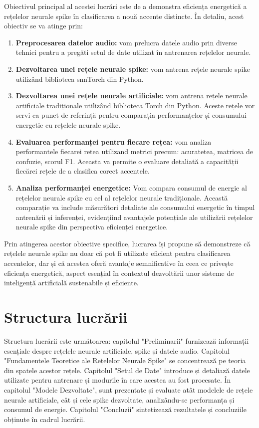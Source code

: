Obiectivul principal al acestei lucrări este de a demonstra eficiența energetică a rețelelor neurale spike în clasificarea a 
nouă accente distincte. În detaliu, acest obiectiv se va atinge prin:
\begin{enumerate}
    \item \textbf{Preprocesarea datelor audio:} vom prelucra datele audio prin diverse tehnici pentru a pregăti setul de date 
    utilizat în antrenarea rețelelor neurale.
    \item \textbf{Dezvoltarea unei rețele neurale spike:} vom antrena rețele neurale spike utilizând biblioteca snnTorch din 
    Python.
    \item \textbf{Dezvoltarea unei rețele neurale artificiale:} vom antrena rețele neurale artificiale tradiționale utilizând 
    biblioteca Torch din Python. Aceste rețele vor servi ca punct de referință pentru comparația performanțelor și consumului 
    energetic cu rețelele neurale spike.
    \item \textbf{Evaluarea performanței pentru fiecare rețea:} vom analiza performantele fiecarei retea utilizand metrici 
    precum: acuratetea, matricea de confuzie, scorul F1. Aceasta va permite o evaluare detaliată a capacității fiecărei rețele 
    de a clasifica corect accentele.
    \item \textbf{Analiza performanței energetice:} Vom compara consumul de energie al rețelelor neurale spike cu cel al 
    rețelelor neurale tradiționale. Această comparație va include măsurători detaliate ale consumului energetic în timpul 
    antrenării și inferenței, evidențiind avantajele potențiale ale utilizării rețelelor neurale spike din perspectiva 
    eficienței energetice.
\end{enumerate}

Prin atingerea acestor obiective specifice, lucrarea își propune să demonstreze că rețelele neurale spike nu doar că pot fi 
utilizate eficient pentru clasificarea accentelor, dar și că acestea oferă avantaje semnificative în ceea ce privește 
eficiența energetică, aspect esențial în contextul dezvoltării unor sisteme de inteligență artificială sustenabile și 
eficiente.


\section{Structura lucrării}

Structura lucrării este următoarea: capitolul "Preliminarii" furnizează informații esențiale despre rețelele neurale 
artificiale, spike și datele audio. Capitolul "Fundamentele Teoretice ale Rețelelor Neurale Spike" se concentrează pe teoria 
din spatele acestor rețele. Capitolul "Setul de Date" introduce și detaliază datele utilizate pentru antrenare și modurile în 
care acestea au fost procesate. În capitolul "Modele Dezvoltate", sunt prezentate și evaluate atât modelele de rețele neurale 
artificiale, cât și cele spike dezvoltate, analizându-se performanța și consumul de energie. Capitolul "Concluzii" 
sintetizează rezultatele și concluziile obținute în cadrul lucrării.